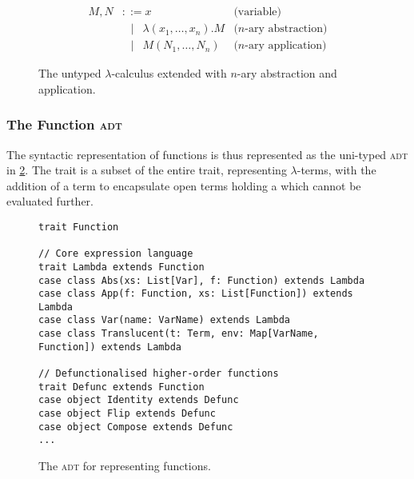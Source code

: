 \documentclass[../../main.tex]{subfiles}
\begin{document}
\begin{figure}
\begin{align*}
M, N &\mathrel{::=} x & \text{(variable)} \\
&\mathrel{\enspace\mid\enspace} \lambda(x_1, \ldots, x_n).M & \text{($n$-ary abstraction)} \\
&\mathrel{\enspace\mid\enspace} M(N_1, \ldots, N_n) & \text{($n$-ary application)}
\end{align*}
\caption{The untyped $\lambda$-calculus extended with $n$-ary abstraction and application.}
\label{fig:lambda-calculus}
\end{figure}

\subsubsection{The Function \textsc{adt}}
The syntactic representation of functions is thus represented as the uni-typed  \textsc{adt} in \cref{fig:function-adt}.
The  trait is a subset of the entire  trait, representing $\lambda$-terms, with the addition of a  term to encapsulate open terms holding a  which cannot be evaluated further.

\begin{figure}
\begin{verbatim}
trait Function

// Core expression language
trait Lambda extends Function
case class Abs(xs: List[Var], f: Function) extends Lambda
case class App(f: Function, xs: List[Function]) extends Lambda
case class Var(name: VarName) extends Lambda
case class Translucent(t: Term, env: Map[VarName, Function]) extends Lambda

// Defunctionalised higher-order functions
trait Defunc extends Function
case object Identity extends Defunc
case object Flip extends Defunc
case object Compose extends Defunc
...
\end{verbatim}
\caption{The  \textsc{adt} for representing functions.}
\label{fig:function-adt}
\end{figure}
\end{document}
